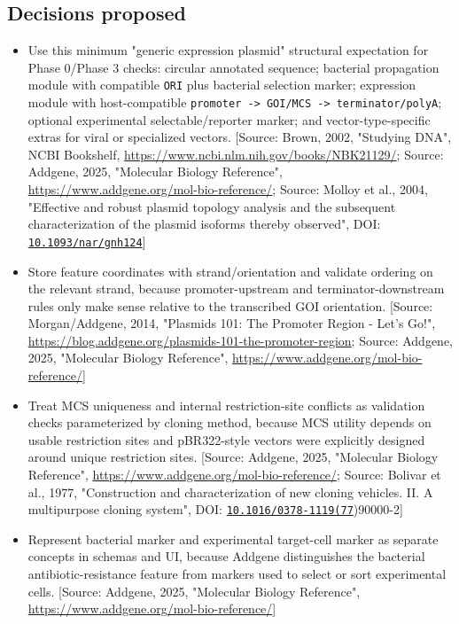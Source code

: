 \documentclass[11pt]{report}
\begin{document}
\subsection{Decisions proposed}
\begin{itemize}
\item Use this minimum "generic expression plasmid" structural expectation for Phase 0/Phase 3 checks: circular annotated sequence; bacterial propagation module with compatible \texttt{ORI} plus bacterial selection marker; expression module with host-compatible \texttt{promoter -> GOI/MCS -> terminator/polyA}; optional experimental selectable/reporter marker; and vector-type-specific extras for viral or specialized vectors. [Source: Brown, 2002, "Studying DNA", NCBI Bookshelf, \url{https://www.ncbi.nlm.nih.gov/books/NBK21129/}; Source: Addgene, 2025, "Molecular Biology Reference", \url{https://www.addgene.org/mol-bio-reference/}; Source: Molloy et al., 2004, "Effective and robust plasmid topology analysis and the subsequent characterization of the plasmid isoforms thereby observed", DOI: \href{https://doi.org/10.1093/nar/gnh124}{\nolinkurl{10.1093/nar/gnh124}}]
\item Store feature coordinates with strand/orientation and validate ordering on the relevant strand, because promoter-upstream and terminator-downstream rules only make sense relative to the transcribed GOI orientation. [Source: Morgan/Addgene, 2014, "Plasmids 101: The Promoter Region - Let's Go!", \url{https://blog.addgene.org/plasmids-101-the-promoter-region}; Source: Addgene, 2025, "Molecular Biology Reference", \url{https://www.addgene.org/mol-bio-reference/}]
\item Treat MCS uniqueness and internal restriction-site conflicts as validation checks parameterized by cloning method, because MCS utility depends on usable restriction sites and pBR322-style vectors were explicitly designed around unique restriction sites. [Source: Addgene, 2025, "Molecular Biology Reference", \url{https://www.addgene.org/mol-bio-reference/}; Source: Bolivar et al., 1977, "Construction and characterization of new cloning vehicles. II. A multipurpose cloning system", DOI: \href{https://doi.org/10.1016/0378-1119(77}{\nolinkurl{10.1016/0378-1119(77}})90000-2]
\item Represent bacterial marker and experimental target-cell marker as separate concepts in schemas and UI, because Addgene distinguishes the bacterial antibiotic-resistance feature from markers used to select or sort experimental cells. [Source: Addgene, 2025, "Molecular Biology Reference", \url{https://www.addgene.org/mol-bio-reference/}]
\end{itemize}
\end{document}
